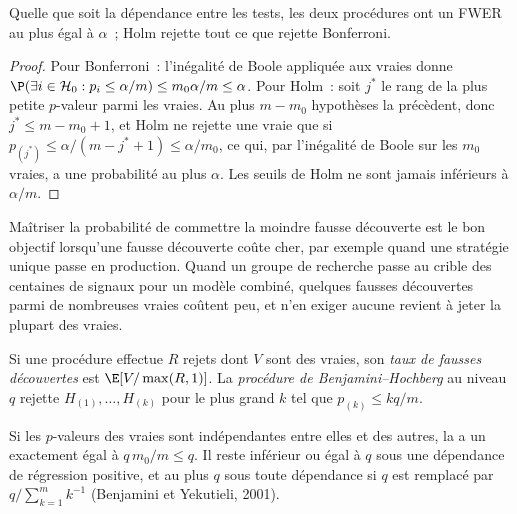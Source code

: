 \begin{proposition}\label{prop:qm:testing-and-multiple-testing:fwer}
Quelle que soit la dépendance entre les tests, les deux procédures ont un FWER au plus égal à $\alpha$~; Holm rejette tout ce que rejette Bonferroni.
\end{proposition}

\begin{proof}
Pour Bonferroni~: l'inégalité de Boole appliquée aux  vraies donne $\P(\exists i \in \mathcal H_0: p_i \le \alpha/m) \le m_0\alpha/m \le \alpha$.
Pour Holm~: soit $j^*$ le rang de la plus petite $p$-valeur parmi les  vraies. Au plus $m - m_0$ hypothèses la précèdent, donc $j^* \le
m - m_0 + 1$, et Holm ne rejette une  vraie que si $p_{(j^*)} \le \alpha/(m - j^* + 1) \le \alpha/m_0$, ce qui, par l'inégalité de Boole sur
les $m_0$  vraies, a une probabilité au plus $\alpha$. Les seuils de Holm ne sont jamais inférieurs à $\alpha/m$.
\end{proof}

Maîtriser la probabilité de commettre la moindre fausse découverte est le bon objectif lorsqu'une fausse découverte coûte cher, par exemple quand une stratégie
unique passe en production. Quand un groupe de recherche passe au crible des centaines de signaux pour un modèle combiné, quelques fausses
découvertes parmi de nombreuses vraies coûtent peu, et n'en exiger aucune revient à jeter la plupart des vraies.

\begin{definition}\label{def:qm:testing-and-multiple-testing:fdr}
Si une procédure effectue $R$ rejets dont $V$ sont des  vraies, son \emph{taux de fausses découvertes} est
$\E[V/\max(R, 1)]$. La \emph{procédure de Benjamini--Hochberg} au niveau $q$ rejette $H_{(1)},
\dots, H_{(k)}$ pour le plus grand $k$ tel que $p_{(k)} \le kq/m$.
\end{definition}

\begin{theorem}\label{thm:qm:testing-and-multiple-testing:bh}
Si les $p$-valeurs des  vraies sont indépendantes entre elles et des autres, la  a un  exactement égal à $q\,m_0/m \le q$. Il reste inférieur ou égal à $q$ sous une dépendance de régression positive, et au plus $q$ sous toute
dépendance si $q$ est remplacé par $q/\sum_{k=1}^m k^{-1}$ (Benjamini et Yekutieli, 2001).
\end{theorem}


